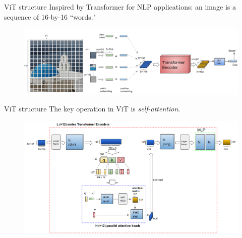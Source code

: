 \documentclass[xcolor={dvipsnames,svgnames}]{beamer}
\begin{document}
\begin{frame}{ViT structure}
Inspired by Transformer for NLP applications: an image is a sequence of 16-by-16 ``words."
      \begin{figure}[H]
        \centering
            \includegraphics[width=\textwidth]{presentation/figures-models/vit_input.png}
        \end{figure} 
\end{frame}
\begin{frame}{ViT structure}
The key operation in ViT is \textit{self-attention}.
        \begin{figure}[H]
        \centering
            \includegraphics[width=\textwidth]{presentation/figures-models/vit_encoder.png}
        \end{figure} 
\end{frame}
\end{document}

